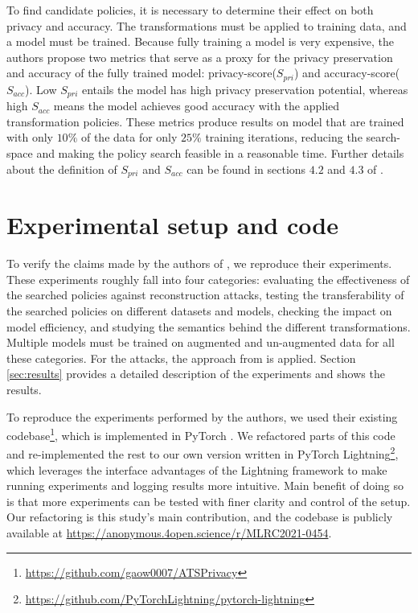 To find candidate policies, it is necessary to determine their effect on both privacy and accuracy. The transformations must be applied to training data, and a model must be trained. Because fully training a model is very expensive, the authors propose two metrics that serve as a proxy for the privacy preservation and accuracy of the fully trained model: privacy-score($S_{pri}$) and accuracy-score($S_{acc}$). Low $S_{pri}$ entails the model has high privacy preservation potential, whereas high $S_{acc}$ means the model achieves good accuracy with the applied transformation policies. These metrics produce results on model that are trained with only $10\%$ of the data for only $25\%$ training iterations, reducing the search-space and making the policy search feasible in a reasonable time. Further details about the definition of $S_{pri}$ and $S_{acc}$ can be found in sections $4.2$ and $4.3$ of \cite{gao2021privacy}.

\section{Experimental setup and code}

To verify the claims made by the authors of \cite{gao2021privacy}, we reproduce their experiments. These experiments roughly fall into four categories: evaluating the effectiveness of the searched policies against reconstruction attacks, testing the transferability of the searched policies on different datasets and models, checking the impact on model efficiency, and studying the semantics behind the different transformations. Multiple models must be trained on augmented and un-augmented data for all these categories. For the attacks, the approach from \cite{geiping2020inverting} is applied. Section \ref{sec:results} provides a detailed description of the experiments and shows the results.

To reproduce the experiments performed by the authors, we used their existing codebase\footnote{\url{https://github.com/gaow0007/ATSPrivacy}}, which is implemented in PyTorch \cite{pytorch2019}. We refactored parts of this code and re-implemented the rest to our own version written in PyTorch Lightning\footnote{\url{https://github.com/PyTorchLightning/pytorch-lightning}}, which leverages the interface advantages of the Lightning framework to make running experiments and logging results more intuitive. Main benefit of doing so is that more experiments can be tested with finer clarity and control of the setup. Our refactoring is this study's main contribution, and the codebase is publicly available at \url{https://anonymous.4open.science/r/MLRC2021-0454}.

